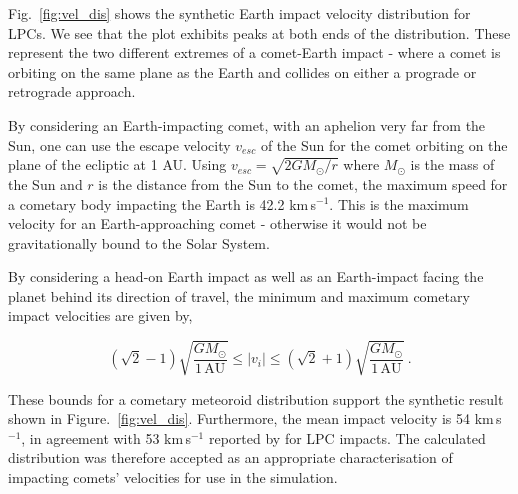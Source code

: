 Fig.~\ref{fig:vel_dis} shows the synthetic Earth impact velocity distribution for LPCs. We see that the plot exhibits peaks at both ends of the distribution. These represent the two different extremes of a comet-Earth impact - where a comet is orbiting on the same plane as the Earth and collides on either a prograde or retrograde approach. 

By considering an Earth-impacting comet, with an aphelion very far from the Sun, one can use the escape velocity $v_{esc}$ of the Sun for the comet orbiting on the plane of the ecliptic at 1 AU. Using $v_{esc}=\sqrt{2GM_{\odot}/r}$ where $M_{\odot}$ is the mass of the Sun and $r$ is the distance from the Sun to the comet, the maximum speed for a cometary body impacting the Earth is 42.2 km$\,$s$^{-1}$. This is the maximum velocity for an Earth-approaching comet - otherwise it would not be gravitationally bound to the Solar System. 

By considering a head-on Earth impact as well as an Earth-impact facing the planet behind its direction of travel, the minimum and maximum cometary impact velocities are given by,

\vspace{-2ex}
\begin{equation}
    (\sqrt{2}-1) \sqrt{ \dfrac{GM_{\odot}}{1 \,\mathrm{AU}} } \leq |v_i| \leq (\sqrt{2}+1) \sqrt{\dfrac{GM_{\odot}}{1 \,\mathrm{AU}}} ~.
\end{equation}
 
These bounds for a cometary meteoroid distribution support the synthetic result shown in Figure.~\ref{fig:vel_dis}. Furthermore, the mean impact velocity is 54 km$\,$s$^{-1}$, in agreement with 53 km$\,$s$^{-1}$ reported by \cite{1988merc.book..274S} for LPC impacts. The calculated distribution was therefore accepted as an appropriate characterisation of impacting comets' velocities for use in the simulation.



